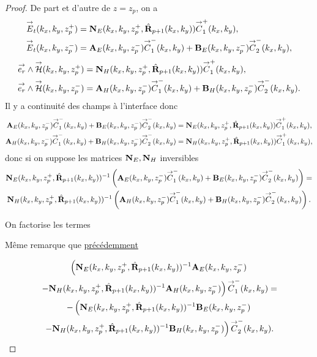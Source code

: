    \begin{proof}
      De part et d'autre de \(z=z_p\), on a 
      \begin{align*}
        {\overset{\rightarrow}{E}}_t(k_x,k_y,z_p^+) &= \mathbf{N}_{E}(k_x,k_y,z_p^+,\hat{\mathbf{R}}_{p+1}(k_x,k_y)){\overset{\rightarrow}{C}}_{1}^+(k_x,k_y),
        \\
        {\overset{\rightarrow}{E}}_t(k_x,k_y,z_p^-) &= \mathbf{A}_E(k_x,k_y,z_p^-){\overset{\rightarrow}{C}}_{1}^-(k_x,k_y) + \mathbf{B}_E(k_x,k_y,z_p^-){\overset{\rightarrow}{C}}_{2}^-(k_x,k_y),
      \end{align*}
      \begin{align*}
        {\overset{\rightarrow}{e_r}}\wedge{\overset{\rightarrow}{\mathcal{H}}}(k_x,k_y,z_p^+) &= \mathbf{N}_{H}(k_x,k_y,z_p^+,\hat{\mathbf{R}}_{p+1}(k_x,k_y)){\overset{\rightarrow}{C}}_{1}^+(k_x,k_y),
        \\
        {\overset{\rightarrow}{e_r}}\wedge{\overset{\rightarrow}{\mathcal{H}}}(k_x,k_y,z_p^-) &= \mathbf{A}_H(k_x,k_y,z_p^-){\overset{\rightarrow}{C}}_{1}^-(k_x,k_y) + \mathbf{B}_H(k_x,k_y,z_p^-){\overset{\rightarrow}{C}}_{2}^-(k_x,k_y).
      \end{align*}
      Il y a continuité des champs à l'interface donc
      \begin{align*}
        \mathbf{A}_E(k_x,k_y,z_p^-){\overset{\rightarrow}{C}}_{1}^-(k_x,k_y) + \mathbf{B}_E(k_x,k_y,z_p^-){\overset{\rightarrow}{C}}_{2}^-(k_x,k_y) &= \mathbf{N}_{E}(k_x,k_y,z_p^+,\hat{\mathbf{R}}_{p+1}(k_x,k_y)){\overset{\rightarrow}{C}}_{1}^+(k_x,k_y),
        \\
        \mathbf{A}_H(k_x,k_y,z_p^-){\overset{\rightarrow}{C}}_{1}^-(k_x,k_y) + \mathbf{B}_H(k_x,k_y,z_p^-){\overset{\rightarrow}{C}}_{2}^-(k_x,k_y) &= \mathbf{N}_{H}(k_x,k_y,z_p^+,\hat{\mathbf{R}}_{p+1}(k_x,k_y)){\overset{\rightarrow}{C}}_{1}^+(k_x,k_y),
      \end{align*}
      donc si on suppose les matrices \(\mathbf{N}_E, \mathbf{N}_H\) inversibles
      \begin{multline*}
        \mathbf{N}_{E}(k_x,k_y,z_p^+,\hat{\mathbf{R}}_{p+1}(k_x,k_y))^{-1}\left(\mathbf{A}_E(k_x,k_y,z_p^-){\overset{\rightarrow}{C}}_{1}^-(k_x,k_y) + \mathbf{B}_E(k_x,k_y,z_p^-){\overset{\rightarrow}{C}}_{2}^-(k_x,k_y)\right) =
        \\
        \mathbf{N}_{H}(k_x,k_y,z_p^+,\hat{\mathbf{R}}_{p+1}(k_x,k_y))^{-1}\left(\mathbf{A}_H(k_x,k_y,z_p^-){\overset{\rightarrow}{C}}_{1}^-(k_x,k_y) + \mathbf{B}_H(k_x,k_y,z_p^-){\overset{\rightarrow}{C}}_{2}^-(k_x,k_y)\right).
      \end{multline*}

      On factorise les termes
      \begin{REM}
        Même remarque que \hyperlink{REMfactorise}{précédemment}
      \end{REM}
      \begin{multline*}
        \left(
        \mathbf{N}_{E}(k_x,k_y,z_p^+,\hat{\mathbf{R}}_{p+1}(k_x,k_y))^{-1}\mathbf{A}_E(k_x,k_y,z_p^-)
        \right.
        \\
        \left.
        - \mathbf{N}_{H}(k_x,k_y,z_p^+,\hat{\mathbf{R}}_{p+1}(k_x,k_y))^{-1}\mathbf{A}_H(k_x,k_y,z_p^-)
        \right){\overset{\rightarrow}{C}}_{1}^-(k_x,k_y) =
        \\
        -\left(
        \mathbf{N}_{E}(k_x,k_y,z_p^+,\hat{\mathbf{R}}_{p+1}(k_x,k_y))^{-1}\mathbf{B}_E(k_x,k_y,z_p^-)
        \right.
        \\
        \left.
        - \mathbf{N}_{H}(k_x,k_y,z_p^+,\hat{\mathbf{R}}_{p+1}(k_x,k_y))^{-1}\mathbf{B}_H(k_x,k_y,z_p^-)
        \right){\overset{\rightarrow}{C}}_{2}^-(k_x,k_y).
      \end{multline*}


\end{proof}
